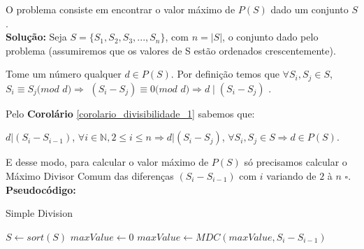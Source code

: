 O problema consiste em encontrar o valor máximo de $P(S)$ dado um conjunto $S$.
\\

\textbf{Solução:} 
Seja $S = \{S_1, S_2, S_3, ..., S_n\}$, com $n = |S|$, o conjunto dado pelo problema (assumiremos que os valores de S estão ordenados crescentemente).

Tome um número qualquer $d \in P(S)$. Por definição temos que $\forall S_i, S_j \in S$, $S_i \equiv S_j ( mod$ $d) \Rightarrow $ 
$ (S_i-S_j) \equiv 0 ( mod$ $d) \Rightarrow d \mid (S_i-S_j)$ .

Pelo \textbf{Corolário} \autoref{corolario_divisibilidade_1} sabemos que:

$d | (S_i-S_{i-1})$, $ \forall i \in \mathbb{N}, 2 \leq i \leq n \Rightarrow d | (S_i-S_j)$, $ \forall S_i, S_j \in S \Rightarrow d \in P(S)$.

E desse modo, para calcular o valor máximo de $P(S)$ só precisamos calcular o Máximo Divisor Comum das diferenças $(S_i-S_{i-1})$ com $i$ variando de $2$ à $n$ $\square$.
\\

\textbf{Pseudocódigo:}
\begin{algorithm}
\caption{Simple Division}\label{euclid}
\begin{algorithmic}[1]
\State $S \gets sort(S)$  
\State $maxValue \gets 0$
\State $maxValue \gets MDC(maxValue, S_i - S_{i-1})$
\EndFor
\State {}
\EndProcedure
\end{algorithmic}
\end{algorithm}



